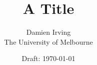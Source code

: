 \documentclass[a4paper,12pt]{article}
\begin{document}
\title{A Title}

\author{Damien Irving\\ The University of Melbourne }

\date{Draft: \today}



\maketitle 
\end{document}

